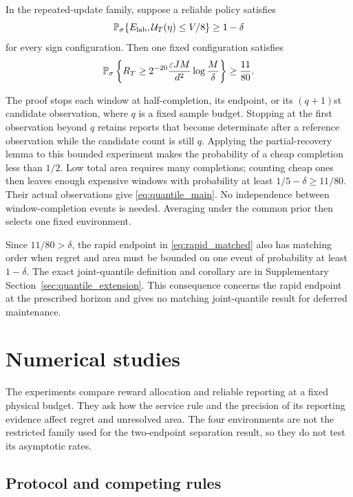 \documentclass[11pt]{article}
\begin{document}
\begin{theorem}
\label{thm:quantile_main}
In the repeated-update family, suppose a reliable policy satisfies
\[
 \mathbb P_\sigma\{E_{\rm lab},\mathcal U_T(\eta)\le V/8\}\ge1-\delta
\]
for every sign configuration. Then one fixed configuration satisfies
\begin{equation}
 \mathbb P_\sigma\left\{R_T\ge
 2^{-20}\frac{\varepsilon JM}{d^2}\log\frac M\delta\right\}
 \ge\frac{11}{80}.
 \label{eq:quantile_main}
\end{equation}
\end{theorem}

The proof stops each window at half-completion, its endpoint, or its
$(q+1)$st candidate observation, where $q$ is a fixed sample budget. Stopping
at the first observation beyond $q$ retains reports that become determinate
after a reference observation while the candidate count is still $q$.
Applying the partial-recovery lemma to this bounded experiment makes the
probability of a cheap completion less than $1/2$. Low total area requires
many completions; counting cheap ones then leaves enough expensive windows
with probability at least $1/5-\delta\ge11/80$. Their actual observations
give \eqref{eq:quantile_main}. No independence between window-completion
events is needed. Averaging under the common prior then selects one fixed
environment.

Since $11/80>\delta$, the rapid endpoint in \eqref{eq:rapid_matched} also
has matching order when regret and area must be bounded on one event of
probability at least $1-\delta$. The exact joint-quantile definition and
corollary are in Supplementary Section~\ref{sec:quantile_extension}. This
consequence concerns the rapid endpoint at the prescribed horizon and gives
no matching joint-quantile result for deferred maintenance.

\section{Numerical studies}
\label{sec:experiments}

The experiments compare reward allocation and reliable reporting at a fixed
physical budget. They ask how the service rule and the precision of its
reporting evidence affect regret and unresolved area. The four environments
are not the restricted family used for the two-endpoint separation result,
so they do not test its asymptotic rates.

\subsection{Protocol and competing rules}
\end{document}
